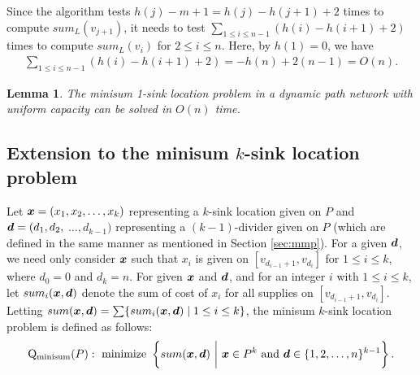\documentclass[a4paper]{llncs}
\newcommand{\bm}[1]{\mbox{\boldmath{$#1$}}}
\newtheorem{lem}{Lemma}
\begin{document}
Since the algorithm tests $h(j)-m+1 = h(j)-h(j+1)+2$ times to compute $sum_L(v_{j+1})$,
it needs to test $\sum_{1 \le i \le n-1} (h(i)-h(i+1)+2)$ times to compute $sum_L(v_i)$ for $2 \le i \le n$.
Here, by $h(1) = 0$, we have
\begin{eqnarray}
\sum_{1 \le i \le n-1} \left( h(i)-h(i+1)+2 \right) = - h(n) + 2(n-1) = O(n).
\end{eqnarray}

\begin{lem}
The minisum 1-sink location problem in a dynamic path network with uniform capacity can be solved in $O(n)$ time.
\label{lem:ms1}
\end{lem}


\subsection{Extension to the minisum $k$-sink location problem}
Let ${\bm x} = (x_1, x_2, \ldots, x_k)$ representing a $k$-sink location given on $P$ and ${\bm d} = (d_1, d_2,$ $\ldots, d_{k-1})$ representing a $(k-1)$-divider given on $P$
(which are defined in the same manner as mentioned in Section \ref{sec:mmp}).
For a given ${\bm d}$, we need only consider ${\bm x}$ such that $x_i $ is given on $[v_{d_{i-1}+1}, v_{d_i}]$ for $1 \le i \le k$, where $d_0 = 0$ and $d_k = n$.
For given ${\bm x}$ and ${\bm d}$,
and for an integer $i$ with $1 \le i \le k$, let $sum_i({\bm x}, {\bm d})$ denote the sum of cost of $x_i$ for all supplies on $[v_{d_{i-1}+1}, v_{d_i}]$.
Letting $sum({\bm x}, {\bm d}) = \sum \{ sum_i({\bm x}, {\bm d}) \mid 1 \le i \le k \}$, the minisum $k$-sink location problem is defined as follows:
\begin{eqnarray}
{\rm Q_{minisum}}(P): \ {\rm minimize} \ \left\{ sum({\bm x}, {\bm d}) \ \bigg| \ {\bm x} \in P^k \ {\rm and} \ {\bm d} \in \{ 1, 2, \ldots, n \}^{k-1} \right\}.
\label{pro2}
\end{eqnarray}
\end{document}
